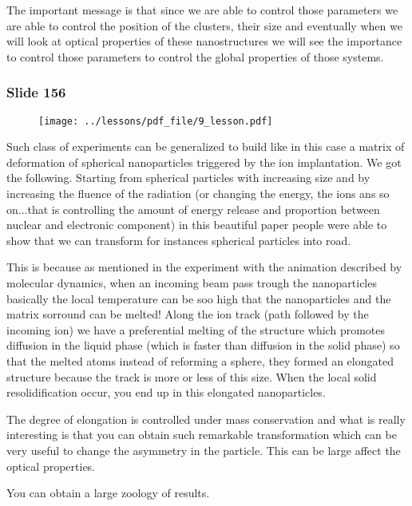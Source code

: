 \documentclass[../main/main.tex]{subfiles}
\begin{document}
The important message is that since we are able to control those parameters we are able to control the position of the clusters, their size and eventually when we will look at optical properties of these nanostructures we will see the importance to control those parameters to control the global properties of those systems.

\newpage

\subsubsection{Slide 156}

\begin{figure}[h!]
\centering
\texttt{[image: ../lessons/pdf\_file/9\_lesson.pdf]}
\end{figure}

Such class of experiments can be generalized to build like in this case a matrix of deformation of spherical nanoparticles triggered by the ion implantation. We got the following.
Starting from spherical particles with increasing size and by increasing the fluence of the radiation (or changing the energy, the ions ans so on...that is controlling the amount of energy release and proportion between nuclear and electronic component) in this beautiful paper people were able to show that we can transform for instances spherical particles into road.

This is because as mentioned in the experiment with the animation described by molecular dynamics, when an incoming beam pass trough the nanoparticles basically the local temperature can be soo high that the nanoparticles and the matrix sorround can be melted! Along the ion track (path followed by the incoming ion) we have a preferential melting of the structure which promotes diffusion in the liquid phase (which is faster than diffusion in the solid phase) so that the melted atoms instead of reforming a sphere, they formed an elongated structure because the track is more or less of this size. When the local solid resolidification occur, you end up in this elongated nanoparticles.

The degree of elongation is controlled under mass conservation and what is really interesting is that you can obtain such remarkable transformation which can be very useful to change the asymmetry in the particle. This can be large affect the optical properties.

You can obtain a large zoology of results.








\clearpage
\end{document}
